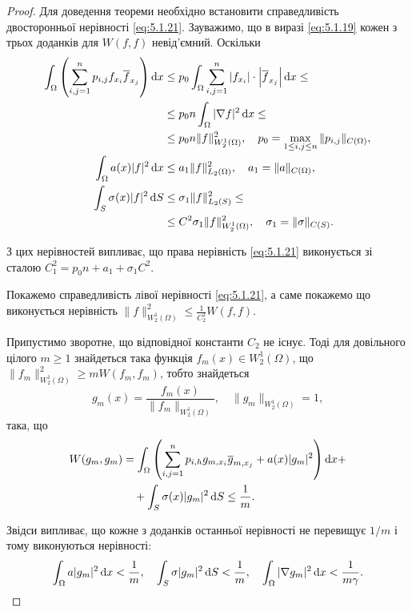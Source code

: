 \begin{proof}
    Для доведення теореми необхідно встановити справедливість двосторонньої нерівності \eqref{eq:5.1.21}. Зауважимо, що в виразі \eqref{eq:5.1.19} кожен з трьох доданків для $W(f,f)$ невід'ємний. Оскільки
    \begin{align*}
        \int_\Omega \left( \sum_{i,j=1}^n p_{i,j} f_{x_i} \overline{f}_{x_j} \right) \mathop{}\!\mathrm{d} x
        &\le p_0 \int_\Omega \sum_{i,j=1}^n \left|f_{x_i}\right| \cdot \left|\overline{f}_{x_j}\right| \mathop{}\!\mathrm{d} x \le \\
        &\le p_0 n \int_\Omega |\nabla f|^2 \mathop{}\!\mathrm{d} x \le \\
        &\le p_0 n \|f\|_{W_2^1(\Omega)}^2, \quad p_0 = \max_{1\le i,j\le n} \|p_{i,j}\|_{C(\Omega)}, \\
        \int_\Omega a(x) |f|^2 \mathop{}\!\mathrm{d} x
        &\le a_1 \|f\|_{L_2(\Omega)}^2, \quad a_1 = \|a\|_{C(\Omega)}, \\
        \int_S \sigma(x) |f|^2 \mathop{}\!\mathrm{d} S
        &\le \sigma_1 \|f\|_{L_2(S)}^2 \le \\
        &\le C^2 \sigma_1 \|f\|_{W_2^1(\Omega)}^2, \quad \sigma_1 = \|\sigma\|_{C(S)}.
    \end{align*}

    З цих нерівностей випливає, що права нерівність \eqref{eq:5.1.21} виконується зі сталою $C_1^2 = p_0 n + a_1 + \sigma_1 C^2$. \medskip

    Покажемо справедливість лівої нерівності \eqref{eq:5.1.21}, а саме покажемо що виконується нерівність $\|f\|_{W_2^1(\Omega)}^2 \le \frac{1}{C_2^2} W(f, f)$. \medskip

    Припустимо зворотне, що відповідної константи $C_2$ не існує. Тоді для довільного цілого $m \ge 1$ знайдеться така функція $f_m(x) \in W_2^1(\Omega)$, що $\|f_m\|_{W_2^1(\Omega)}^2 \ge m W(f_m, f_m)$, тобто знайдеться \[g_m(x) = \frac{f_m(x)}{\|f_m\|_{W_2^1(\Omega)}},\quad \|g_m\|_{W_2^1(\Omega)} = 1,\] така, що
    \begin{align*}
        W(g_m, g_m)
        &= \int_\Omega \left( \sum_{i,j=1}^np_{i,h} g_{m, x_i} \overline{g}_{m, x_j} + a(x) |g_m|^2 \right) \mathop{}\!\mathrm{d} x + \\
        &\quad + \int_S \sigma(x) |g_m|^2 \mathop{}\!\mathrm{d} S \le \frac{1}{m}.     
    \end{align*}

    Звідси випливає, що кожне з доданків останньої нерівності не перевищує $1/m$ і тому виконуються нерівності:
    \begin{equation}
        \label{eq:5.1.23}
        \int_\Omega a|g_m|^2 \mathop{}\!\mathrm{d} x < \frac{1}{m}, \quad \int_S \sigma |g_m|^2 \mathop{}\!\mathrm{d} S < \frac{1}{m}, \quad \int_\Omega |\nabla g_m|^2 \mathop{}\!\mathrm{d} x < \frac{1}{m \gamma}.
    \end{equation}


\end{proof}
